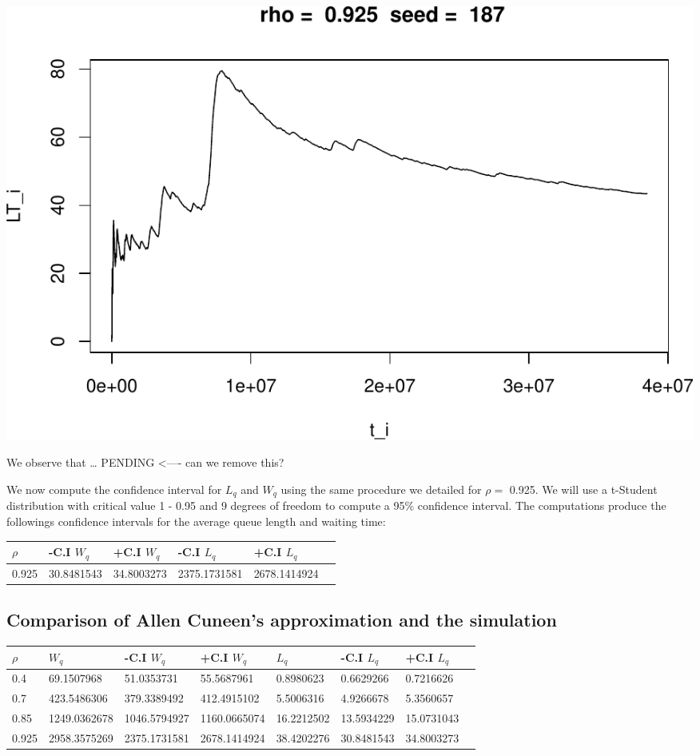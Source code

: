 \documentclass[]{article}
\begin{document}
\includegraphics{003_files/figure-latex/unnamed-chunk-22-10.pdf}

We observe that \ldots{} PENDING \textless{}---- can we remove this?

We now compute the confidence interval for \(L_{q}\) and \(W_{q}\) using
the same procedure we detailed for \(\rho =\) 0.925. We will use a
t-Student distribution with critical value 1 - 0.95 and 9 degrees of
freedom to compute a 95\% confidence interval. The computations produce
the followings confidence intervals for the average queue length and
waiting time:

\begin{longtable}[]{@{}llllll@{}}
\toprule
\(\rho\) & -C.I \(W_{q}\) & +C.I \(W_{q}\) & -C.I \(L_{q}\) & +C.I
\(L_{q}\) &\tabularnewline
\midrule
\endhead
0.925 & 30.8481543 & 34.8003273 & 2375.1731581 &
2678.1414924\tabularnewline
\bottomrule
\end{longtable}

\subsection{Comparison of Allen Cuneen's approximation and the
simulation}\label{comparison-of-allen-cuneens-approximation-and-the-simulation}

\begin{longtable}[]{@{}llllllll@{}}
\toprule
\(\rho\) & \(W_{q}\) & -C.I \(W_{q}\) & +C.I \(W_{q}\) & \(L_{q}\) &
-C.I \(L_{q}\) & +C.I \(L_{q}\) &\tabularnewline
\midrule
\endhead
0.4 & 69.1507968 & 51.0353731 & 55.5687961 & 0.8980623 & 0.6629266 &
0.7216626\tabularnewline
0.7 & 423.5486306 & 379.3389492 & 412.4915102 & 5.5006316 & 4.9266678 &
5.3560657\tabularnewline
0.85 & 1249.0362678 & 1046.5794927 & 1160.0665074 & 16.2212502 &
13.5934229 & 15.0731043\tabularnewline
0.925 & 2958.3575269 & 2375.1731581 & 2678.1414924 & 38.4202276 &
30.8481543 & 34.8003273\tabularnewline
\bottomrule
\end{longtable}
\end{document}
